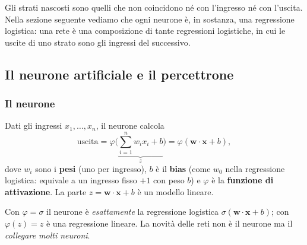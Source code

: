 \documentclass[12pt]{extarticle}
\begin{document}
\noindent Gli strati nascosti sono quelli che non coincidono né con l'ingresso né con l'uscita. Nella sezione seguente vediamo che ogni neurone è, in sostanza, una regressione logistica: una rete è una composizione di tante regressioni logistiche, in cui le uscite di uno strato sono gli ingressi del successivo.

\subsection{Il neurone artificiale e il percettrone}

\subsubsection{Il neurone}

\noindent Dati gli ingressi $x_1,\dots,x_n$, il neurone calcola
\[
\text{uscita}=\varphi\Big(\underbrace{\sum_{i=1}^n w_i x_i+b}_{z}\Big)=\varphi(\mathbf{w}\cdot\mathbf{x}+b),
\]
dove $w_i$ sono i \textbf{pesi} (uno per ingresso), $b$ è il \textbf{bias} (come $w_0$ nella regressione logistica: equivale a un ingresso fisso $+1$ con peso $b$) e $\varphi$ è la \textbf{funzione di attivazione}. La parte $z=\mathbf{w}\cdot\mathbf{x}+b$ è un modello lineare.

\begin{center}
\end{center}

\noindent Con $\varphi=\sigma$ il neurone è \emph{esattamente} la regressione logistica $\sigma(\mathbf{w}\cdot\mathbf{x}+b)$; con $\varphi(z)=z$ è una regressione lineare. La novità delle reti non è il neurone ma il \emph{collegare molti neuroni}.
\end{document}
